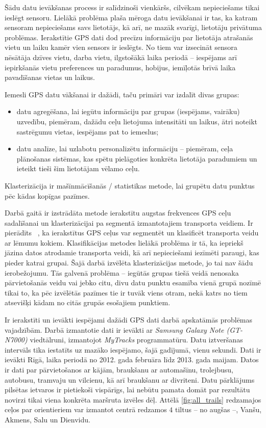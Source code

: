 \documentclass{ludis}
\begin{document}
Šādu datu ievākšanas process ir salīdzinoši vienkāršs, cilvēkam nepieciešams tikai ieslēgt sensoru.
Lielākā problēma plaša mēroga datu ievākšanai ir tas, ka katram sensoram nepieciešams savs 
lietotājs, kā arī, ne mazāk svarīgi, lietotāju privātuma problēmas. Ierakstītie GPS dati dod
precīzu informāciju par lietotāja atrašanās vietu un laiku kamēr vien sensors ir ieslēgts. 
No tiem var izsecināt sensora nēsātāja dzīves vietu, darba vietu, ilgstošākā laika periodā -- 
iespējams arī iepirkšanās vietu preferences un paradumus, hobijus, iemīļotās brīvā laika 
pavadīšanas vietas un laikus.

Iemesli GPS datu vākšanai ir dažādi, taču primāri var izdalīt divas grupas:
\begin{itemize}
\item datu agregēšana, lai iegūtu informāciju par grupas (iespējams, vairāku) uzvedību, piemēram, 
  dažādu ceļu lietojuma intensitāti un laikus, ātri noteikt sastrēgumu vietas, iespējams pat to 
  iemeslus;
\item datu analīze, lai uzlabotu personalizētu informāciju -- piemēram, ceļa plānošanas sistēmas,
  kas spētu pielāgoties konkrēta lietotāja paradumiem un ieteikt tieši šim lietotājam vēlamo ceļu.
\end{itemize}

Klasterizācija ir mašīnmācīšanās / statistikas metode, lai grupētu datu punktus pēc kādas kopīgas
pazīmes.

Darbā gaitā ir izstrādāta metode ierakstītu augstas frekvences GPS ceļu sadalīšanai un 
klasterizācijai pa segmentā izmantotajiem transporta veidiem. Ir pierādīts 
~\cite{zheng_gps_segmentation}, ka ierakstītus GPS ceļus var segmentēt un klasificēt transporta
veidu ar lēmumu kokiem. Klasifikācijas metodes lielākā problēma ir tā, ka iepriekš jāzina 
datos atrodamie transporta veidi, kā arī nepieciešami iezīmēti paraugi, kas pieder katrai grupai.
Šajā darbā izvēlēta klasterizācijas metode, jo tai nav šādu ierobežojumu. Tās galvenā problēma --
iegūtās grupas tiešā veidā nenosaka pārvietošanās veidu vai jebko citu, divu datu punktu esamība
vienā grupā nozīmē tikai to, ka pēc izvēlētās pazīmes tie ir tuvāk viens otram, nekā katrs 
no tiem atsevišķi kādam no citās grupās esošajiem punktiem.

Ir ierakstīti un ievākti iespējami dažādi GPS dati darbā apskatāmās problēmas vajadzībām. 
Darbā izmantotie dati ir ievākti ar \emph{Samsung Galaxy Note (GT-N7000)} viedtālruni, izmantojot
\emph{MyTracks} programmatūru. Datu iztveršanas intervāls tika iestatīts uz mazāko iespējamo,
šajā gadījumā, vienu sekundi. Dati ir ievākti Rīgā, laika periodā no 2012. gada februāra līdz 
2013. gada maijam. Datos ir dati par pārvietošanos ar kājām, braukšanu ar automašīnu, trolejbusu,
autobusu, tramvaju un vilcienu, kā arī braukšanu ar divriteni. Datu pārklājums pilsētas ietvaros 
ir pietiekoši vispārīgs, lai nebūtu pamata domāt par rezultātu novirzi tikai viena konkrēta 
maršruta izvēles dēļ. Attēlā \ref{fig:all_trails} redzamajos ceļos par orientieriem var izmantot
centrā redzamos $4$ tiltus -- no augšas --, Vanšu, Akmens, Salu un Dienvidu.
\end{document}

